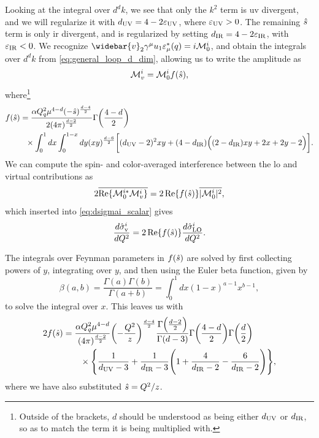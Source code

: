 Looking at the integral over $d^dk$, we see that only the $k^2$ term is \gls{uv} divergent, and we will regularize it with $d_{\mathrm{UV}}=4-2\varepsilon_{\mathrm{UV}}$, where $\varepsilon_{\mathrm{UV}}>0$.
The remaining $\hat{s}$ term is only \gls{ir} divergent, and is regularized by setting $d_{\mathrm{IR}}=4-2\varepsilon_{\mathrm{IR}}$, with $\varepsilon_{\mathrm{IR}}<0$.
We recognize $\widebar{v}_2\gamma^\mu u_1\eps^*_\mu(q) = i\M^i_0$, and obtain the integrals over $d^dk$ from \cref{eq:general_loop_d_dim}, allowing us to write the amplitude as
\begin{equation}
    \mathcal{M}^i_v = \mathcal{M}^i_0 f(\hat{s}),
\end{equation}
where\footnote{Outside of the brackets, $d$ should be understood as being either $d_{\mathrm{UV}}$ or $d_{\mathrm{IR}}$, so as to match the term it is being multiplied with.}
\begin{equation}
\begin{split}
    f(\hat{s}) &= \frac{\alpha Q_q^2\mu^{4-d} (-\hat{s})^{\frac{d-4}{2}}}{2(4\pi)^{\frac{d-2}{2}}}
    \Gamma\biggl( \frac{4-d}{2} \biggr)
    \\ &\quad\!\! \times
    \int_0^1 dx \int_0^{1-x}dy
    (xy)^{\frac{d-6}{2}} \biggl[ (d_{\mathrm{UV}}-2)^2xy + (4-d_{\mathrm{IR}}) \Bigl( (2-d_{\mathrm{IR}})xy + 2x + 2y - 2 \Bigr) \biggr].
\end{split}
\end{equation}
We can compute the spin- and color-averaged interference between the \gls{lo} and virtual contributions as
\begin{equation}
    2\overline{\operatorname{Re}\{\mathcal{M}^{i*}_0\mathcal{M}^i_v\}}
    = 2 \operatorname{Re}\{f(\hat{s})\} \overline{\lvert\mathcal{M}^i_0\rvert^2},
\end{equation}
which inserted into \cref{eq:dsigmai_scalar} gives
\begin{equation}
    \frac{d\hat\sigma^i_{\mathrm{v}}}{dQ^2} = 2 \operatorname{Re}\{f(\hat{s})\} \frac{d\hat\sigma^i_{\mathrm{LO}}}{dQ^2}.
    \label{eq:sigma_virt_Re_f}
\end{equation}

The integrals over Feynman parameters in $f(\hat{s})$ are solved by first collecting powers of $y$, integrating over $y$, and then using the Euler beta function, given by~\cite{Schwartz:2014sze}
\begin{equation}
    \beta(a,b) = \frac{\Gamma(a)\Gamma(b)}{\Gamma(a+b)} = \int_0^1 dx (1-x)^{a-1}x^{b-1},
    \label{eq:beta_func}
\end{equation}
to solve the integral over $x$. This leaves us with
\begin{equation}
\begin{split}
    2f(\hat{s}) &= \frac{\alpha Q_q^2\mu^{4-d}}{(4\pi)^{\frac{d-2}{2}}}
    \biggl(-\frac{Q^2}{z}\biggr)^{\frac{d-4}{2}}
    \frac{\Gamma\Bigl(\frac{d-2}{2}\Bigr)}{\Gamma(d-3)}
    \Gamma\biggl(\frac{4-d}{2}\biggr) \Gamma\biggl(\frac{d}{2}\biggr)
    \\ &\qquad \times
    \Biggl\{
        \frac{1}{d_{\mathrm{UV}}-3}
        + \frac{1}{d_{\mathrm{IR}}-3}\Biggl( 1 + \frac{4}{d_{\mathrm{IR}}-2} - \frac{6}{d_{\mathrm{IR}}-2} \Biggr)
    \Biggr\},
\end{split}
\label{eq:f_after_xy_integral}
\end{equation}
where we have also substituted $\hat{s} = Q^2/z$.

